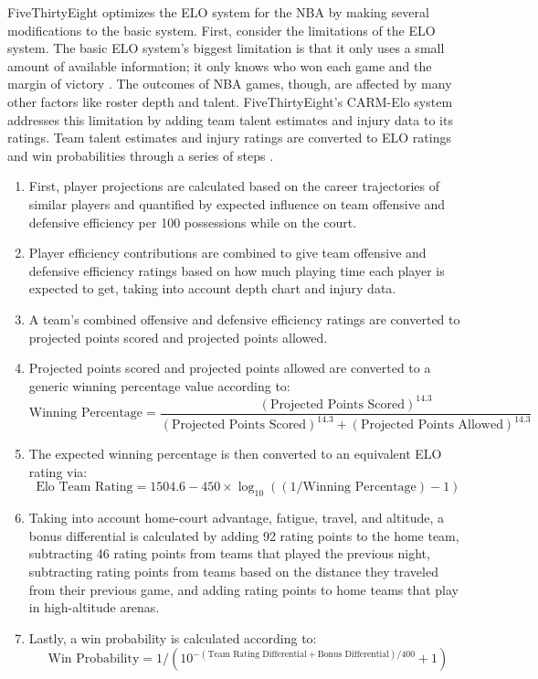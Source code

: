 \documentclass[pageno]{jpaper}
\begin{document}
FiveThirtyEight optimizes the ELO system for the NBA by making several modifications to the basic system. First, consider the limitations of the ELO system. The basic ELO system's biggest limitation is that it only uses a small amount of available information; it only knows who won each game and the margin of victory \cite{538pred}. The outcomes of NBA games, though, are affected by many other factors like roster depth and talent. FiveThirtyEight's CARM-Elo system addresses this limitation by adding team talent estimates and injury data to its ratings. Team talent estimates and injury ratings are converted to ELO ratings and win probabilities through a series of steps \cite{538pred}.
\begin{enumerate}
    \item First, player projections are calculated based on the career trajectories of similar players and quantified by expected influence on team offensive and defensive efficiency per 100 possessions while on the court.
    \item Player efficiency contributions are combined to give team offensive and defensive efficiency ratings based on how much playing time each player is expected to get, taking into account depth chart and injury data.
    \item A team's combined offensive and defensive efficiency ratings are converted to projected points scored and projected points allowed.
    \item Projected points scored and projected points allowed are converted to a generic winning percentage value according to: $$\text{Winning Percentage} = \frac{(\text{Projected Points Scored})^{14.3}}{(\text{Projected Points Scored})^{14.3} + (\text{Projected Points Allowed})^{14.3}}$$
    \item The expected winning percentage is then converted to an equivalent ELO rating via:
    $$\text{Elo Team Rating} = 1504.6 - 450 \times \log_{10}((1/\text{Winning Percentage})-1)$$
    \item Taking into account home-court advantage, fatigue, travel, and altitude, a bonus differential is calculated by adding 92 rating points to the home team, subtracting 46 rating points from teams that played the previous night, subtracting rating points from teams based on the distance they traveled from their previous game, and adding rating points to home teams that play in high-altitude arenas.
    \item Lastly, a win probability is calculated according to:
    $$\text{Win Probability} = 1/(10^{-(\text{Team Rating Differential}+\text{Bonus Differential})/400}+1)$$
\end{enumerate}
\end{document}
